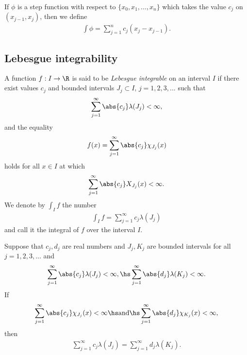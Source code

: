 \documentclass{article}
\begin{document}
\begin{definition}[Notes 4.2]
	If $\phi$ is a step function with respect to $\{x_0, x_1, ..., x_n\}$ which takes the
	value $c_j$ on $(x_{j-1}, x_j)$, then we define
	\begin{align*}
		\int \phi = \sum_{j=1}^n c_j(x_j-x_{j-1}).
	\end{align*}
\end{definition}

\subsection{Lebesgue integrability}

\begin{definition}[Notes 4.3]
	A function $f:I\to\R$ is said to be \emph{Lebesgue integrable} on an interval
	$I$ if there exist values $c_j$ and bounded intervals $J_j\subset I$, $j=1,2,3,...$
	such that
	\begin{align*}
		\sum_{j=1}^\infty \abs{c_j}\lambda (J_j) < \infty,
	\end{align*}
	and the equality
	\begin{align*}
		f(x) = \sum_{j=1}^\infty \abs{c_j}\chi_{J_j}(x)
	\end{align*}
	holds for all $x\in I$ at which
	\begin{align*}
		\sum_{j=1}^\infty \abs{c_j} X_{J_j}(x) < \infty.
	\end{align*}
	We denote by $\int_I f$ the number
	\begin{align*}
		\int_I f = \sum_{j=1}^\infty c_j\lambda(J_j)
	\end{align*}
	and call it the integral of $f$ over the interval $I$.
\end{definition}

\begin{theorem}[Notes 4.1]
	Suppose that $c_j,d_j$ are real numbers and $J_j,K_j$ are bounded intervals
	for all $j=1,2,3,...$ and
	\begin{align*}
		\sum_{j=1}^\infty \abs{c_j}\lambda(J_j)<\infty, \hs
		\sum_{j=1}^\infty \abs{d_j}\lambda(K_j)<\infty.
	\end{align*}
	If
	\begin{align*}
		\sum_{j=1}^\infty \abs{c_j}\chi_{J_j}(x) < \infty\hs\text{and}\hs
		\sum_{j=1}^\infty \abs{d_j}\chi_{K_j}(x) <\infty,
	\end{align*}
	then
	\begin{align*}
		\sum_{j=1}^\infty c_j\lambda(J_j)= \sum_{j=1}^\infty d_j\lambda(K_j).
	\end{align*}
\end{theorem}
\end{document}
